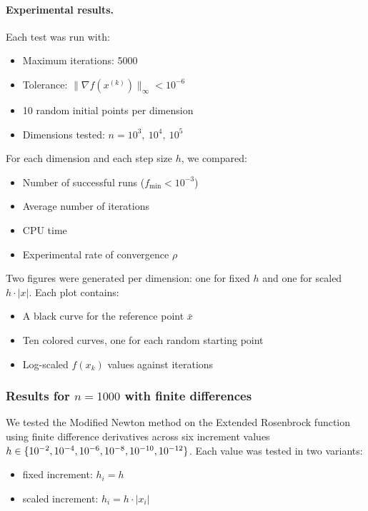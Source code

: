 \documentclass[a4paper,12pt]{article}
\begin{document}
	\paragraph{Experimental results.}
	Each test was run with:
	\begin{itemize}[nosep]
		\item Maximum iterations: 5000
		\item Tolerance: \( \|\nabla f(x^{(k)})\|_\infty < 10^{-6} \)
		\item 10 random initial points per dimension
		\item Dimensions tested: \( n = 10^3,\ 10^4,\ 10^5 \)
	\end{itemize}
	
	For each dimension and each step size \( h \), we compared:
	\begin{itemize}[nosep]
		\item Number of successful runs (\( f_{\min} < 10^{-3} \))
		\item Average number of iterations
		\item CPU time
		\item Experimental rate of convergence \(\rho\)
	\end{itemize}
	
	Two figures were generated per dimension: one for fixed \( h \) and one for scaled \( h \cdot |x| \). Each plot contains:
	\begin{itemize}[nosep]
		\item A black curve for the reference point \( \bar{x} \)
		\item Ten colored curves, one for each random starting point
		\item Log-scaled \( f(x_k) \) values against iterations
	\end{itemize}
	
	\subsubsection*{Results for $n = 1000$ with finite differences}
	
	We tested the Modified Newton method on the Extended Rosenbrock function using finite difference derivatives across six increment values \( h \in \{10^{-2}, 10^{-4}, 10^{-6}, \\ 10^{-8}, 10^{-10}, 10^{-12}\} \). Each value was tested in two variants:
	\begin{itemize}[nosep]
		\item fixed increment: \( h_i = h \)
		\item scaled increment: \( h_i = h \cdot |x_i| \)
	\end{itemize}
	
\end{document}
